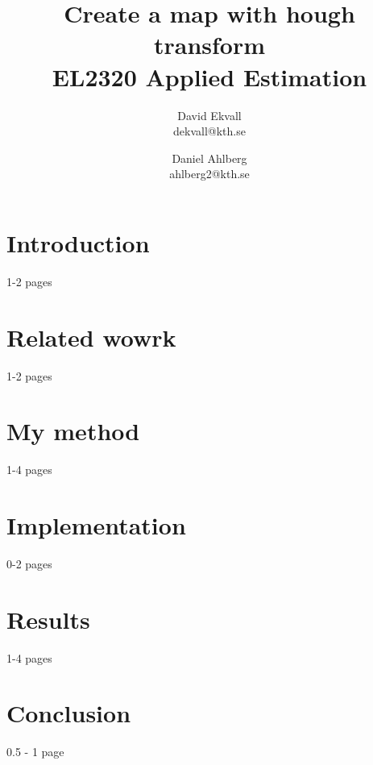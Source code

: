 \documentclass[a4paper,11pt]{article}
\title{
	Create a map with hough transform\\
	EL2320 Applied Estimation
}
\author{
	David Ekvall\\
	dekvall@kth.se\\
	\and
	Daniel Ahlberg\\
	ahlberg2@kth.se\\
}
\begin{document}
\maketitle
{}

\section{Introduction}
1-2 pages

\section{Related wowrk}
1-2 pages \cite{reed2016generative}

\section{My method}
1-4 pages

\section{Implementation}
0-2 pages

\section{Results}
1-4 pages

\section{Conclusion}
0.5 - 1 page

\printbibliography
\end{document}
